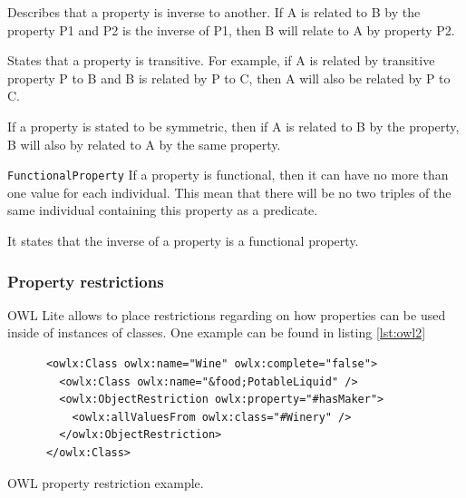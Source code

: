 \begin{description}
\item[\texttt{inverseOf}] Describes that a property is inverse to another. If A is related to B by the property P1 and P2 is the inverse of P1, then B will relate to A by property P2.

\item[\texttt{TransitiveProperty}] States that a property is transitive. For example, if A is related by transitive property P to B and B is related by P to C, then A will also be related by P to C.

\item[\texttt{SymmetrycProperty}] If a property is stated to be symmetric, then if A is related to B by the property, B will also by related to A by the same property.

\item{\texttt{FunctionalProperty}} If a property is functional, then it can have no more than one value for each individual. This mean that there will be no two triples of the same individual containing this property as a predicate.

\item[\texttt{InverseFunctionalProperty}] It states that the inverse of a property is a functional property.
\end{description}

\subsubsection*{Property restrictions}

OWL Lite allows to place restrictions regarding on how properties can be used inside of instances of classes. One example can be found in listing \ref{lst:owl2}

\begin{listing}\centering
  \begin{minipage}{.8\textwidth}
    \begin{verbatim}
      <owlx:Class owlx:name="Wine" owlx:complete="false">
        <owlx:Class owlx:name="&food;PotableLiquid" />  
        <owlx:ObjectRestriction owlx:property="#hasMaker"> 
          <owlx:allValuesFrom owlx:class="#Winery" />
        </owlx:ObjectRestriction> 
      </owlx:Class>
    \end{verbatim}
  \end{minipage}
  \caption{OWL property restriction example.}\label{lst:owl2}
\end{listing}


